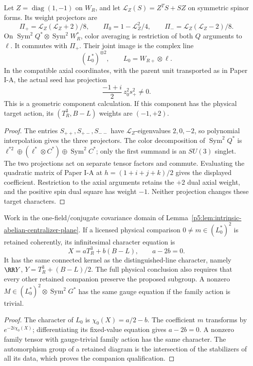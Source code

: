 \documentclass[12pt,a4paper]{article}
\begin{document}
\begin{proposition}
\label{p5:prop:commuting-hopf-color-comparison-projections}
\label{p5:prop:joint-hopf-color-projection}
Let \(Z=\operatorname{diag}(1,-1)\) on \(W_R\), and let
\(\mathcal L_Z(S)=Z^TS+SZ\) on symmetric spinor forms.  Its
weight projectors are
\[
 \Pi_+=\mathcal L_Z(\mathcal L_Z+2)/8,\qquad
 \Pi_0=1-\mathcal L_Z^2/4,\qquad
 \Pi_-=\mathcal L_Z(\mathcal L_Z-2)/8.
\]
On \(\operatorname{Sym}^2Q^*\otimes\operatorname{Sym}^2W_R^*\),
color averaging is restriction of both \(Q\) arguments to \(\ell\).
It commutes with \(\Pi_+\).  Their joint image is the complex line
\[
 (L_0^*)^{\otimes2},\qquad L_0=W_{R+}\otimes\ell.
\]
In the compatible axial coordinates, with the parent unit
transported as in Paper I-A, the actual seed has projection
\[
 \frac{-1+i}{2}\,z_0^2s_+^2\ne0.
\]
This is a geometric component calculation.  If this component
has the physical target action, its \((T_R^3,B-L)\) weights are
\((-1,+2)\).
\end{proposition}
\begin{proof}
The entries \(S_{++},S_{+-},S_{--}\) have
\(\mathcal L_Z\)-eigenvalues \(2,0,-2\), so polynomial
interpolation gives the three projectors.
The color decomposition of \(\operatorname{Sym}^2Q^*\)
is \(\ell^{*2}\oplus(\ell^*\otimes C^*)\oplus
\operatorname{Sym}^2C^*\); only the first summand is an
\(SU(3)\) singlet.  The two projections act on separate
tensor factors and commute.  Evaluating the quadratic matrix
of Paper I-A at \(h=(1+i+j+k)/2\) gives the displayed coefficient.
Restriction to the axial arguments retains the \(+2\) dual
axial weight, and the positive spin dual square has weight
\(-1\).  Neither projection changes these target characters.
\end{proof}

\begin{proposition}
\label{p5:prop:complete-retained-quadratic-y-criterion}
\label{p5:thm:quadratic-incidence-yfix-criterion}
Work in the one-field/conjugate covariance domain of
Lemma~\ref{p5:lem:intrinsic-abelian-centralizer-plane}.
If a licensed physical comparison \(0\ne m\in(L_0^*)^2\)
is retained coherently, its infinitesimal character equation is
\[
 X=aT_R^3+b(B-L),\qquad a-2b=0.
\]
It has the same connected kernel as the distinguished-line
character, namely \(\RR Y\), \(Y=T_R^3+(B-L)/2\).
The full physical conclusion also requires that every other
retained companion preserve the proposed subgroup.
A nonzero \(M\in(L_0^*)^2\otimes\operatorname{Sym}^2G^*\)
has the same gauge equation if the family action is trivial.
\end{proposition}
\begin{proof}
The character of \(L_0\) is \(\chi_0(X)=a/2-b\).
The coefficient \(m\) transforms by \(e^{-2i\chi_0(X)}\);
differentiating its fixed-value equation gives \(a-2b=0\).
A nonzero family tensor with gauge-trivial family action has
the same character.  The automorphism group of a retained
diagram is the intersection of the stabilizers of all its
data, which proves the companion qualification.
\end{proof}
\end{document}
